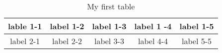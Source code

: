 \documentclass{article}
\begin{document}
\begin{table}[!hbp]
\caption{My first table}
\centering
\begin{tabular}{|c|c|c|c|c|}
\hline
lable 1-1 & label 1-2 & label 1-3 & label 1 -4 & label 1-5 \\
\hline
label 2-1 & label 2-2 & label 3-3 & label 4-4 & label 5-5 \\
\hline
\end{tabular}
\end{table}
\end{document}

